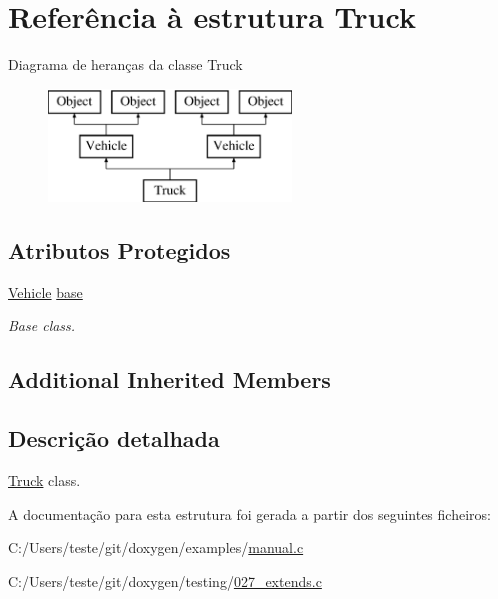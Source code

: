 \hypertarget{struct_truck}{\section{Referência à estrutura Truck}
\label{struct_truck}
}
Diagrama de heranças da classe Truck\begin{figure}[H]
\begin{center}
\leavevmode
\includegraphics[height=3.000000cm]{struct_truck}
\end{center}
\end{figure}
\subsection*{Atributos Protegidos}
\begin{DoxyCompactItemize}
\item 
\hypertarget{struct_truck_aea78492ff0e6add272aedd448bf00b6c}{\hyperlink{struct_vehicle}{Vehicle} \hyperlink{struct_truck_aea78492ff0e6add272aedd448bf00b6c}{base}}\label{struct_truck_aea78492ff0e6add272aedd448bf00b6c}

\begin{DoxyCompactList}\small\item\em Base class. \end{DoxyCompactList}\end{DoxyCompactItemize}
\subsection*{Additional Inherited Members}


\subsection{Descrição detalhada}
\hyperlink{struct_truck}{Truck} class. 

A documentação para esta estrutura foi gerada a partir dos seguintes ficheiros\-:\begin{DoxyCompactItemize}
\item 
C\-:/\-Users/teste/git/doxygen/examples/\hyperlink{manual_8c}{manual.\-c}\item 
C\-:/\-Users/teste/git/doxygen/testing/\hyperlink{027__extends_8c}{027\-\_\-extends.\-c}\end{DoxyCompactItemize}
